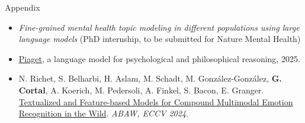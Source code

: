 \documentclass[handout,10pt]{beamer}
\begin{document}
\begin{frame}{Appendix}

\begin{itemize}
    \item \textit{Fine-grained mental health topic modeling in different populations using large language models} (PhD internship, to be submitted for Nature Mental Health)
    \item \href{https://huggingface.co/gustavecortal/Piaget-8B}{Piaget}, a language model for psychological and philosophical reasoning, 2025.
    \item N. Richet, S. Belharbi, H. Aslam, M. Schadt, M. González-González, \textbf{G. Cortal}, A. Koerich, M. Pedersoli, A. Finkel, S. Bacon, E. Granger. \href{https://arxiv.org/abs/2407.12927}{Textualized and Feature-based Models for Compound Multimodal Emotion Recognition in the Wild}. \textit{ABAW, ECCV 2024}.
\end{itemize}
    
\end{frame}
\end{document}
